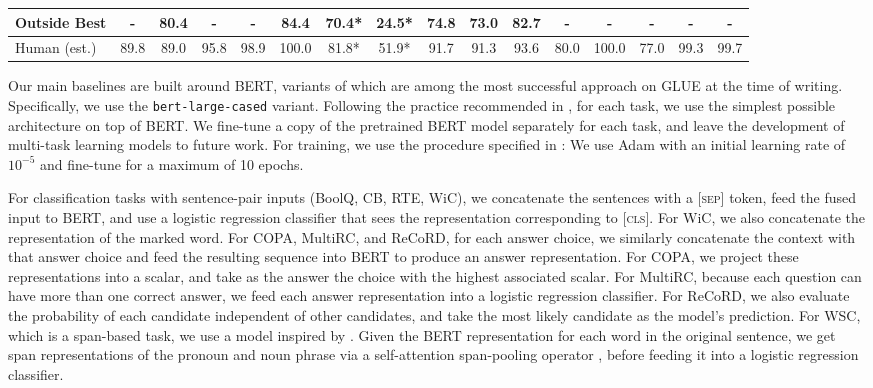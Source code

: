 \begin{table*}[t]
\begin{tabular}{lccc@{/}ccc@{/}cc@{/}cccccc@{/}c}
Outside Best & - & \textbf{80.4} & - &  - & \textbf{84.4} & \textbf{70.4}* & \textbf{24.5}* & \textbf{74.8} & \textbf{73.0} & \textbf{82.7} & - & - & - & - & - \\

\midrule
Human (est.) & 89.8 & 89.0 & 95.8 & 98.9 & 100.0 & 81.8* & 51.9* & 91.7 & 91.3 & 93.6 & 80.0 & 100.0 & 77.0 & 99.3 & 99.7 \\

\bottomrule
\end{tabular}

\label{tab:benchmark}
\end{table*}

Our main baselines are built around BERT, variants of which are among the most successful approach on GLUE at the time of writing. Specifically, we use the \texttt{bert-large-cased} variant.
Following the practice recommended in \citet{devlin2018bert}, for each task, we use the simplest possible architecture on top of BERT. We fine-tune a copy of the pretrained BERT model separately for each task, and leave the development of multi-task learning models to future work. For training, we use the procedure specified in \citet{devlin2018bert}:
We use Adam \citep{kingma2014adam} with an initial learning rate of $10^{-5}$ and fine-tune for a maximum of 10 epochs.

For classification tasks with sentence-pair inputs (BoolQ, CB, RTE, WiC), we concatenate the sentences with a \textsc{[sep]} token, feed the fused input to BERT, and use a logistic regression classifier that sees the representation corresponding to \textsc{[cls]}.
For WiC, we also concatenate the representation of the marked word. %
For COPA, MultiRC, and ReCoRD, for each answer choice, we similarly concatenate the context with that answer choice and feed the resulting sequence into BERT to produce an answer representation.
For COPA, we project these representations into a scalar, and take as the answer the choice with the highest associated scalar.
For MultiRC, because each question can have more than one correct answer, we feed each answer representation into a logistic regression classifier.
For ReCoRD, we also evaluate the probability of each candidate independent of other candidates, and take the most likely candidate as the model's prediction.
For WSC, which is a span-based task, we use a model inspired by \citet{tenney2018you}.
Given the BERT representation for each word in the original sentence, we get span representations of the pronoun and noun phrase via a self-attention span-pooling operator \citep{lee2017end}, before feeding it into a logistic regression classifier. 

